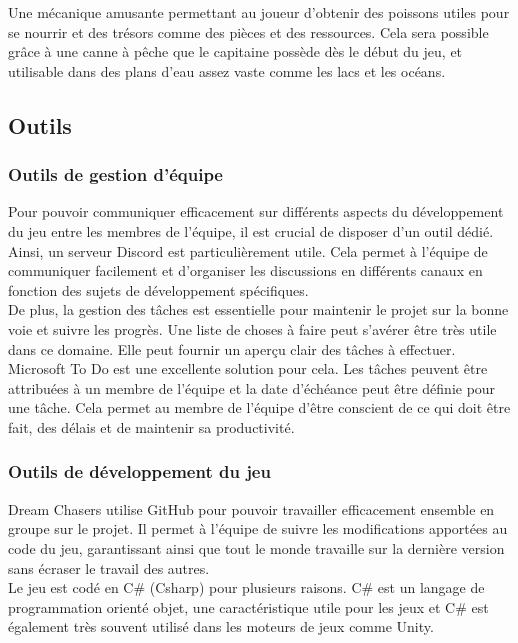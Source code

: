 \documentclass{article}
\begin{document}
Une mécanique amusante permettant au joueur d’obtenir des poissons utiles pour se nourrir et des trésors comme des pièces et des ressources. Cela sera possible grâce à une canne à pêche que le capitaine possède dès le début du jeu, et utilisable dans des plans d'eau assez vaste comme les lacs et les océans.





\subsection{Outils}
\subsubsection{Outils de gestion d’équipe}\hfill

Pour pouvoir communiquer efficacement sur différents aspects du développement du jeu entre les membres de l’équipe, il est crucial de disposer d’un outil dédié. Ainsi, un serveur Discord est particulièrement utile. Cela permet à l'équipe de communiquer facilement et d’organiser les discussions en différents canaux en fonction des sujets de développement spécifiques.\\

De plus, la gestion des tâches est essentielle pour maintenir le projet sur la bonne voie et suivre les progrès. Une liste de choses à faire peut s’avérer être très utile dans ce domaine. Elle peut fournir un aperçu clair des tâches à effectuer. Microsoft To Do est une excellente solution pour cela. Les tâches peuvent être attribuées à un membre de l'équipe et la date d'échéance peut être définie pour une tâche. Cela permet au membre de l'équipe d'être conscient de ce qui doit être fait, des délais et de maintenir sa productivité.



\subsubsection{Outils de développement du jeu}\hfill

Dream Chasers utilise GitHub pour pouvoir travailler efficacement ensemble en groupe sur le projet. Il permet à l’équipe de suivre les modifications apportées au code du jeu, garantissant ainsi que tout le monde travaille sur la dernière version sans écraser le travail des autres.\\

Le jeu est codé en C\# (Csharp) pour plusieurs raisons. C\# est un langage de programmation orienté objet, une caractéristique utile pour les jeux et C\# est également très souvent utilisé dans les moteurs de jeux comme Unity.\\
\end{document}
